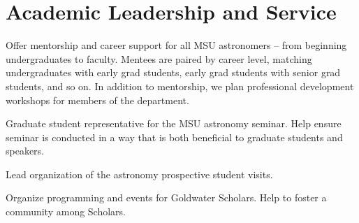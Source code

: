 \documentclass[letterpaper]{deedy-resume} %
\begin{document}


\section{Academic Leadership and Service}

\protected{}
Offer mentorship and career support for all MSU astronomers -- from beginning undergraduates to faculty. Mentees are paired by career level, matching undergraduates with early grad students,
early grad students with senior grad students, and so on. In addition to mentorship, we plan professional development workshops for members of the department.
\sectionspace %


Graduate student representative for the MSU astronomy seminar. Help ensure seminar is conducted in a way that is both beneficial to graduate students and speakers.
\sectionspace %



Lead organization of the astronomy prospective student visits.
\sectionspace %



Organize programming and events for Goldwater Scholars. Help to foster a
community among Scholars.
\sectionspace %


\end{document}

